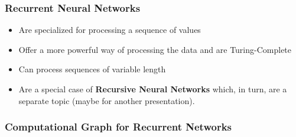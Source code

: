 \documentclass{beamer}
\begin{document}
\begin{frame}
  \frametitle{Recurrent Neural Networks}
  \begin{itemize}
    \item Are specialized for processing a sequence of values \cite{goodfellow-et-al-2016}
    \item Offer a more powerful way of processing the data \cite{rnn-lecture} and are Turing-Complete \cite{siegelmann1995}
    \item Can process sequences of variable length \cite{goodfellow-et-al-2016}
    \item Are a special case of \textbf{Recursive Neural Networks} which, in turn, are a separate topic (maybe for another presentation).
  \end{itemize}
\end{frame}
\begin{frame}
  \frametitle{Computational Graph for Recurrent Networks}
  \begin{columns}
    \begin{column}{0.3\textwidth}
      \begin{center}

\end{center}
\end{column}
\end{columns}
\end{frame}
\end{document}
